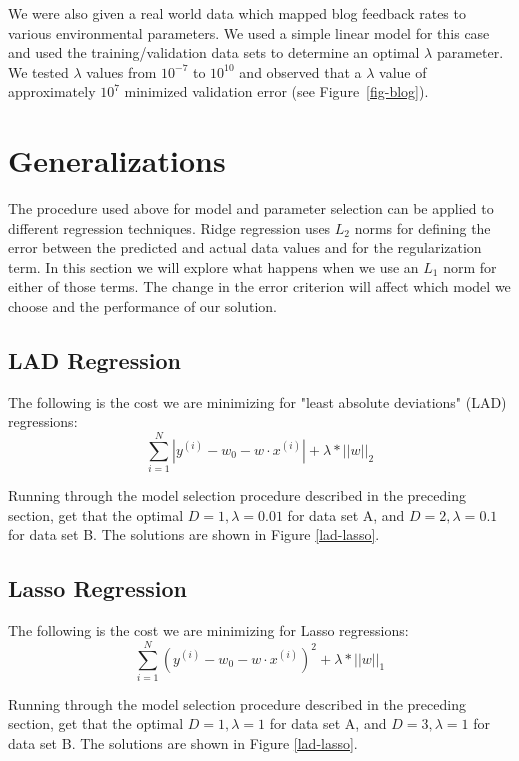 \documentclass[10pt]{article}   %
\theoremstyle{plain}
\begin{document}
We were also given a real world data which mapped blog feedback rates to various environmental parameters. We used a simple linear model for this case and used the training/validation data sets to determine an optimal $\lambda$ parameter. We tested $\lambda$ values from $10^{-7}$ to $10^{10}$ and observed that a $\lambda$ value of approximately $10^7$ minimized validation error (see Figure~\ref{fig-blog}).

\section{Generalizations}

The procedure used above for model and parameter selection can be applied to different regression techniques. Ridge regression uses $L_2$ norms for defining the error between the predicted and actual data values and for the regularization term. In this section we will explore what happens when we use an $L_1$ norm for either of those terms. The change in the error criterion will affect which model we choose and the performance of our solution.

\subsection{LAD Regression}

The following is the cost we are minimizing for "least absolute deviations" (LAD) regressions: \[\sum\limits_{i=1}^{N} |y^{(i)} - w_0 - w \cdot x^{(i)}| + \lambda * ||w||_2\]

Running through the model selection procedure described in the preceding section, get that the optimal $D=1, \lambda=0.01$ for data set A, and $D=2, \lambda = 0.1$ for data set B. The solutions are shown in Figure \ref{lad-lasso}. 

\subsection{Lasso Regression}

The following is the cost we are minimizing for Lasso regressions: \[\sum\limits_{i=1}^{N} (y^{(i)} - w_0 - w \cdot x^{(i)})^2 + \lambda * ||w||_1\]

Running through the model selection procedure described in the preceding section, get that the optimal $D=1, \lambda=1$ for data set A, and $D=3, \lambda = 1$ for data set B. The solutions are shown in Figure \ref{lad-lasso}. 
\end{document}

